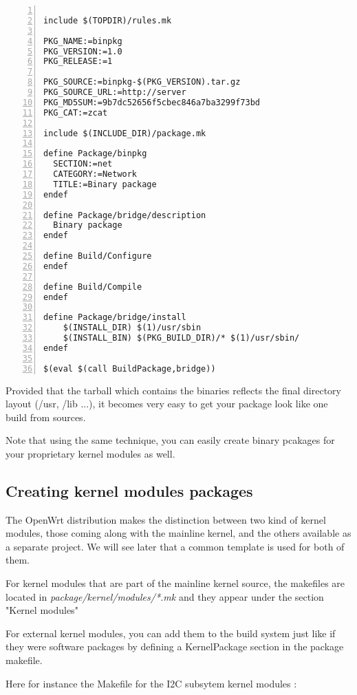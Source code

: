 \begin{Verbatim}[frame=single,numbers=left]

include $(TOPDIR)/rules.mk

PKG_NAME:=binpkg
PKG_VERSION:=1.0
PKG_RELEASE:=1

PKG_SOURCE:=binpkg-$(PKG_VERSION).tar.gz
PKG_SOURCE_URL:=http://server
PKG_MD5SUM:=9b7dc52656f5cbec846a7ba3299f73bd
PKG_CAT:=zcat

include $(INCLUDE_DIR)/package.mk

define Package/binpkg
  SECTION:=net
  CATEGORY:=Network
  TITLE:=Binary package
endef

define Package/bridge/description
  Binary package
endef

define Build/Configure
endef

define Build/Compile
endef

define Package/bridge/install
    $(INSTALL_DIR) $(1)/usr/sbin
    $(INSTALL_BIN) $(PKG_BUILD_DIR)/* $(1)/usr/sbin/
endef

$(eval $(call BuildPackage,bridge))
\end{Verbatim}

Provided that the tarball which contains the binaries reflects the final
directory layout (/usr, /lib ...), it becomes very easy to get your package
look like one build from sources.

Note that using the same technique, you can easily create binary pcakages
for your proprietary kernel modules as well.

\subsection{Creating kernel modules packages}

The OpenWrt distribution makes the distinction between two kind of kernel modules, those coming along with the mainline kernel, and the others available as a separate project. We will see later that a common template is used for both of them.

For kernel modules that are part of the mainline kernel source, the makefiles are located in \textit{package/kernel/modules/*.mk} and they appear under the section "Kernel modules"

For external kernel modules, you can add them to the build system just like if they were software packages by defining a KernelPackage section in the package makefile.

Here for instance the Makefile for the I2C subsytem kernel modules :

